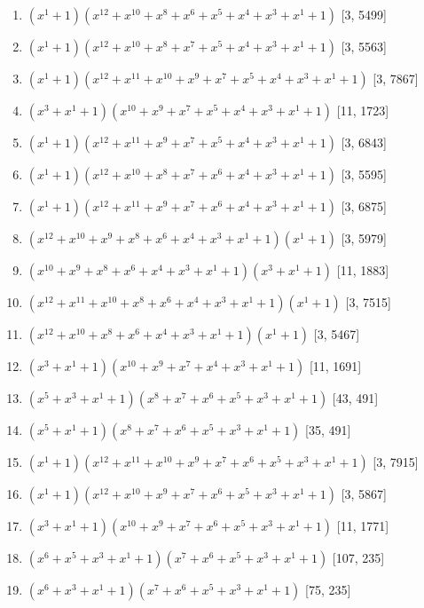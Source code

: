 \documentclass[10pt,twocolumn]{article}
\begin{document}
\begin{enumerate}
\item $(x^{1} + 1)(x^{12} + x^{10} + x^{8} + x^{6} + x^{5} + x^{4} + x^{3} + x^{1} + 1)$  [3, 5499]
\item $(x^{1} + 1)(x^{12} + x^{10} + x^{8} + x^{7} + x^{5} + x^{4} + x^{3} + x^{1} + 1)$  [3, 5563]
\item $(x^{1} + 1)(x^{12} + x^{11} + x^{10} + x^{9} + x^{7} + x^{5} + x^{4} + x^{3} + x^{1} + 1)$  [3, 7867]
\item $(x^{3} + x^{1} + 1)(x^{10} + x^{9} + x^{7} + x^{5} + x^{4} + x^{3} + x^{1} + 1)$  [11, 1723]
\item $(x^{1} + 1)(x^{12} + x^{11} + x^{9} + x^{7} + x^{5} + x^{4} + x^{3} + x^{1} + 1)$  [3, 6843]
\item $(x^{1} + 1)(x^{12} + x^{10} + x^{8} + x^{7} + x^{6} + x^{4} + x^{3} + x^{1} + 1)$  [3, 5595]
\item $(x^{1} + 1)(x^{12} + x^{11} + x^{9} + x^{7} + x^{6} + x^{4} + x^{3} + x^{1} + 1)$  [3, 6875]
\item $(x^{12} + x^{10} + x^{9} + x^{8} + x^{6} + x^{4} + x^{3} + x^{1} + 1)(x^{1} + 1)$  [3, 5979]
\item $(x^{10} + x^{9} + x^{8} + x^{6} + x^{4} + x^{3} + x^{1} + 1)(x^{3} + x^{1} + 1)$  [11, 1883]
\item $(x^{12} + x^{11} + x^{10} + x^{8} + x^{6} + x^{4} + x^{3} + x^{1} + 1)(x^{1} + 1)$  [3, 7515]
\item $(x^{12} + x^{10} + x^{8} + x^{6} + x^{4} + x^{3} + x^{1} + 1)(x^{1} + 1)$  [3, 5467]
\item $(x^{3} + x^{1} + 1)(x^{10} + x^{9} + x^{7} + x^{4} + x^{3} + x^{1} + 1)$  [11, 1691]
\item $(x^{5} + x^{3} + x^{1} + 1)(x^{8} + x^{7} + x^{6} + x^{5} + x^{3} + x^{1} + 1)$  [43, 491]
\item $(x^{5} + x^{1} + 1)(x^{8} + x^{7} + x^{6} + x^{5} + x^{3} + x^{1} + 1)$  [35, 491]
\item $(x^{1} + 1)(x^{12} + x^{11} + x^{10} + x^{9} + x^{7} + x^{6} + x^{5} + x^{3} + x^{1} + 1)$  [3, 7915]
\item $(x^{1} + 1)(x^{12} + x^{10} + x^{9} + x^{7} + x^{6} + x^{5} + x^{3} + x^{1} + 1)$  [3, 5867]
\item $(x^{3} + x^{1} + 1)(x^{10} + x^{9} + x^{7} + x^{6} + x^{5} + x^{3} + x^{1} + 1)$  [11, 1771]
\item $(x^{6} + x^{5} + x^{3} + x^{1} + 1)(x^{7} + x^{6} + x^{5} + x^{3} + x^{1} + 1)$  [107, 235]
\item $(x^{6} + x^{3} + x^{1} + 1)(x^{7} + x^{6} + x^{5} + x^{3} + x^{1} + 1)$  [75, 235]

\end{enumerate}
\end{document}
